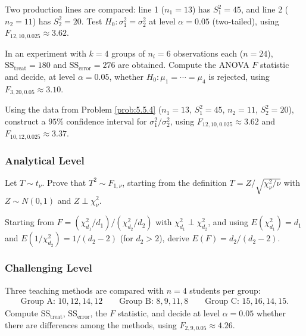 \begin{problema}
	\label{prob:5.5.4}
	Two production lines are compared: line 1 ($n_1=13$) has $S_1^2=45$, and line 2 ($n_2=11$) has $S_2^2=20$. Test $H_0:\sigma_1^2=\sigma_2^2$ at level $\alpha=0.05$ (two-tailed), using $F_{12,10,0.025}\approx 3.62$.
\end{problema}

\begin{problema}
	\label{prob:5.5.5}
	In an experiment with $k=4$ groups of $n_i=6$ observations each ($n=24$), $\text{SS}_{\text{treat}}=180$ and $\text{SS}_{\text{error}}=276$ are obtained. Compute the ANOVA $F$ statistic and decide, at level $\alpha=0.05$, whether $H_0:\mu_1=\cdots=\mu_4$ is rejected, using $F_{3,20,0.05}\approx 3.10$.
\end{problema}

\begin{problema}
	\label{prob:5.5.6}
	Using the data from Problem \ref{prob:5.5.4} ($n_1=13$, $S_1^2=45$, $n_2=11$, $S_2^2=20$), construct a $95\%$ confidence interval for $\sigma_1^2/\sigma_2^2$, using $F_{12,10,0.025}\approx 3.62$ and $F_{10,12,0.025}\approx 3.37$.
\end{problema}

\subsubsection*{Analytical Level}

\begin{problema}
	\label{prob:5.5.7}
	Let $T \sim t_\nu$. Prove that $T^2 \sim F_{1,\nu}$, starting from the definition $T=Z/\sqrt{\chi^2_\nu/\nu}$ with $Z\sim N(0,1)$ and $Z\perp\chi^2_\nu$.
\end{problema}

\begin{problema}
	\label{prob:5.5.8}
	Starting from $F=(\chi^2_{d_1}/d_1)/(\chi^2_{d_2}/d_2)$ with $\chi^2_{d_1}\perp\chi^2_{d_2}$, and using $E(\chi^2_{d_1})=d_1$ and $E(1/\chi^2_{d_2})=1/(d_2-2)$ (for $d_2>2$), derive $E(F)=d_2/(d_2-2)$.
\end{problema}

\subsubsection*{Challenging Level}

\begin{problema}
	\label{prob:5.5.9}
	Three teaching methods are compared with $n=4$ students per group:
	\begin{align*}
		\text{Group A: } 10, 12, 14, 12 \qquad \text{Group B: } 8, 9, 11, 8 \qquad \text{Group C: } 15, 16, 14, 15.
	\end{align*}
	Compute $\text{SS}_{\text{treat}}$, $\text{SS}_{\text{error}}$, the $F$ statistic, and decide at level $\alpha=0.05$ whether there are differences among the methods, using $F_{2,9,0.05}\approx 4.26$.
\end{problema}

